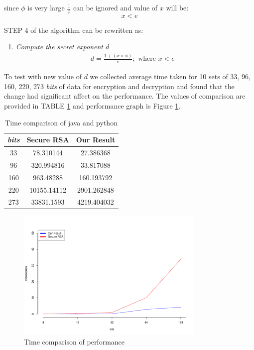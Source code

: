 \documentclass[conference]{IEEEtran}
\begin{document}
since $\phi$ is very large $\frac{1}{\phi}$ can be ignored and value of $x$ will be:
\begin{equation}
	x < e
\end{equation}


STEP 4 of the algorithm can be rewritten as:

\begin{enumerate}[ {STEP }4{:} ]
\item \emph{Compute the secret exponent $d$}
	\begin{align}
		d = \frac{1 + (x \times \phi)}{e}; \text{ where } x < e&
	\end{align}
\end{enumerate}

To test with new value of $d$ we collected average time taken for 10 sets of 33, 96, 160, 220, 273 \emph{bits} of data for encryption and decryption and found that the change had significant affect on the performance. The values of comparison are provided in TABLE \ref{table:rsaVSjava} and performance graph is Figure \ref{fig:rsaVSjava}.

\begin{table}[ht]
	\begin{center}
	\begin{tabular}{|c|c|c|}
    	\hline
       		\emph{bits}	&		Secure RSA		&	Our Result\\
	\hline
    		33			&	78.310144	&	27.386368\\
		96			&	320.994816	&	33.817088\\
		160			&	963.48288	&	160.193792\\
		220			&	10155.14112	&	2901.262848\\
		273			&	33831.1593	&	4219.404032\\
	\hline
	\end{tabular}
	\end{center}
	\caption{Time comparison of java and python}
	\label{table:rsaVSjava}

\end{table}

\begin{figure}[ht!]
\centering
\includegraphics[width=90mm]{images/rsaVSjava.pdf}
\caption{Time comparison of performance}
\label{fig:rsaVSjava}
\end{figure}
\end{document}
